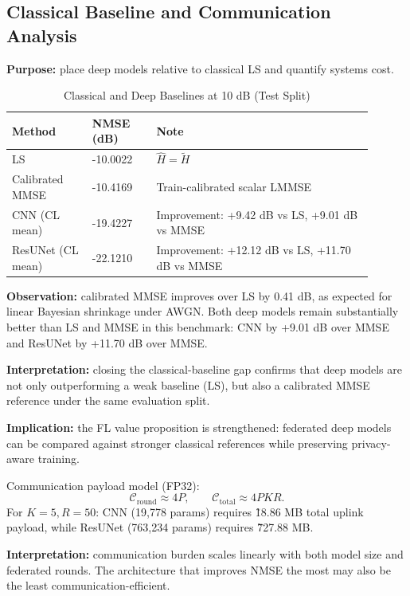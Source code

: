 \documentclass[onecolumn]{IEEEtran}
\begin{document}
\subsection{Classical Baseline and Communication Analysis}
\textbf{Purpose:} place deep models relative to classical LS and quantify systems cost.

\begin{table}[t]
\caption{Classical and Deep Baselines at 10 dB (Test Split)}
\label{tab:ls}
\centering
\begin{tabular}{p{0.20\linewidth}p{0.16\linewidth}p{0.54\linewidth}}
\toprule
Method & NMSE (dB) & Note \\
\midrule
LS & -10.0022 & $\hat H=\tilde H$ \\
Calibrated MMSE & -10.4169 & Train-calibrated scalar LMMSE \\
CNN (CL mean) & -19.4227 & Improvement: +9.42 dB vs LS, +9.01 dB vs MMSE \\
ResUNet (CL mean) & -22.1210 & Improvement: +12.12 dB vs LS, +11.70 dB vs MMSE \\
\bottomrule
\end{tabular}
\end{table}

\textbf{Observation:} calibrated MMSE improves over LS by 0.41 dB, as expected for linear Bayesian shrinkage under AWGN. Both deep models remain substantially better than LS and MMSE in this benchmark: CNN by +9.01 dB over MMSE and ResUNet by +11.70 dB over MMSE.

\textbf{Interpretation:} closing the classical-baseline gap confirms that deep models are not only outperforming a weak baseline (LS), but also a calibrated MMSE reference under the same evaluation split.

\textbf{Implication:} the FL value proposition is strengthened: federated deep models can be compared against stronger classical references while preserving privacy-aware training.

Communication payload model (FP32):
\begin{equation}
\mathcal{C}_{\text{round}}\approx 4P,\qquad
\mathcal{C}_{\text{total}}\approx 4PKR.
\end{equation}
For $K{=}5, R{=}50$: CNN (19,778 params) requires \~18.86 MB total uplink payload, while ResUNet (763,234 params) requires \~727.88 MB.

\textbf{Interpretation:} communication burden scales linearly with both model size and federated rounds. The architecture that improves NMSE the most may also be the least communication-efficient.
\end{document}
